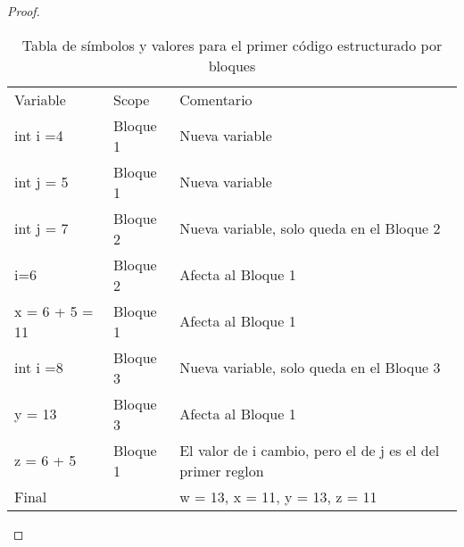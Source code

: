 \begin{proof}
    \hspace{5mm}

\begin{table}[h!]
\centering
\begin{tabular}{lll}
Variable                    & Scope    & Comentario                                                 \\
int i =4                    & Bloque 1 & Nueva variable                                             \\
int j = 5                   & Bloque 1 & Nueva variable                                             \\
int j = 7                   & Bloque 2 & Nueva variable, solo queda en el Bloque 2                  \\ 
i=6                         & Bloque 2 & Afecta al Bloque 1                                         \\
x = 6 + 5 = 11                       & Bloque 1 & Afecta al Bloque 1                                         \\
int i =8                    & Bloque 3 & Nueva variable, solo queda en el Bloque 3                  \\
y = 13                      & Bloque 3 & Afecta al Bloque 1                                         \\
z = 6 + 5                   & Bloque 1 & El valor de i cambio, pero el de j es el del primer reglon \\
Final                       &          & w = 13, x = 11, y = 13, z = 11                             
\end{tabular}
\caption{Tabla de símbolos y valores para el primer código estructurado por bloques}
\end{table}


\end{proof}
